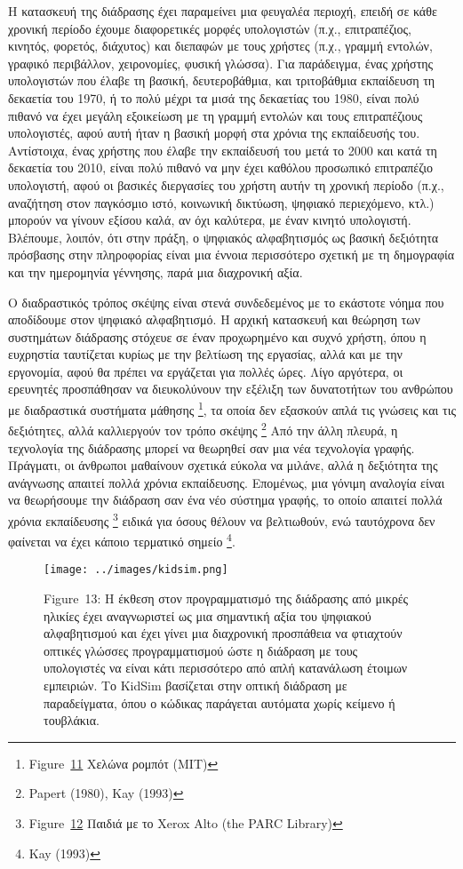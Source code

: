 \documentclass[
]{article}
\begin{document}
Η κατασκευή της διάδρασης έχει παραμείνει μια φευγαλέα περιοχή, επειδή
σε κάθε χρονική περίοδο έχουμε διαφορετικές μορφές υπολογιστών (π.χ.,
επιτραπέζιος, κινητός, φορετός, διάχυτος) και διεπαφών με τους χρήστες
(π.χ., γραμμή εντολών, γραφικό περιβάλλον, χειρονομίες, φυσική γλώσσα).
Για παράδειγμα, ένας χρήστης υπολογιστών που έλαβε τη βασική,
δευτεροβάθμια, και τριτοβάθμια εκπαίδευση τη δεκαετία του 1970, ή το
πολύ μέχρι τα μισά της δεκαετίας του 1980, είναι πολύ πιθανό να έχει
μεγάλη εξοικείωση με τη γραμμή εντολών και τους επιτραπέζιους
υπολογιστές, αφού αυτή ήταν η βασική μορφή στα χρόνια της εκπαίδευσής
του. Αντίστοιχα, ένας χρήστης που έλαβε την εκπαίδευσή του μετά το 2000
και κατά τη δεκαετία του 2010, είναι πολύ πιθανό να μην έχει καθόλου
προσωπικό επιτραπέζιο υπολογιστή, αφού οι βασικές διεργασίες του χρήστη
αυτήν τη χρονική περίοδο (π.χ., αναζήτηση στον παγκόσμιο ιστό, κοινωνική
δικτύωση, ψηφιακό περιεχόμενο, κτλ.) μπορούν να γίνουν εξίσου καλά, αν
όχι καλύτερα, με έναν κινητό υπολογιστή. Βλέπουμε, λοιπόν, ότι στην
πράξη, ο ψηφιακός αλφαβητισμός ως βασική δεξιότητα πρόσβασης στην
πληροφορίας είναι μια έννοια περισσότερο σχετική με τη δημογραφία και
την ημερομηνία γέννησης, παρά μια διαχρονική αξία.

Ο διαδραστικός τρόπος σκέψης είναι στενά συνδεδεμένος με το εκάστοτε
νόημα που αποδίδουμε στον ψηφιακό αλφαβητισμό. Η αρχική κατασκευή και
θεώρηση των συστημάτων διάδρασης στόχευε σε έναν προχωρημένο και συχνό
χρήστη, όπου η ευχρηστία ταυτίζεται κυρίως με την βελτίωση της εργασίας,
αλλά και με την εργονομία, αφού θα πρέπει να εργάζεται για πολλές ώρες.
Λίγο αργότερα, οι ερευνητές προσπάθησαν να διευκολύνουν την εξέλιξη των
δυνατοτήτων του ανθρώπου με διαδραστικά συστήματα μάθησης \footnote{Figure~\protect\hyperlink{fig:logo-robot}{11}
  Χελώνα ρομπότ (MIT)}, τα οποία δεν εξασκούν απλά τις γνώσεις και τις
δεξιότητες, αλλά καλλιεργούν τον τρόπο σκέψης \footnote{Papert (1980),
  Kay (1993)} Από την άλλη πλευρά, η τεχνολογία της διάδρασης μπορεί να
θεωρηθεί σαν μια νέα τεχνολογία γραφής. Πράγματι, οι άνθρωποι μαθαίνουν
σχετικά εύκολα να μιλάνε, αλλά η δεξιότητα της ανάγνωσης απαιτεί πολλά
χρόνια εκπαίδευσης. Επομένως, μια γόνιμη αναλογία είναι να θεωρήσουμε
την διάδραση σαν ένα νέο σύστημα γραφής, το οποίο απαιτεί πολλά χρόνια
εκπαίδευσης \footnote{Figure~\protect\hyperlink{fig:children-alto}{12}
  Παιδιά με το Xerox Alto (the PARC Library)} ειδικά για όσους θέλουν να
βελτιωθούν, ενώ ταυτόχρονα δεν φαίνεται να έχει κάποιο τερματικό σημείο
\footnote{Kay (1993)}.

\leavevmode{}%
\begin{figure}
\hypertarget{fig:kidsim}{%
\centering
\texttt{[image: ../images/kidsim.png]}
\caption{Figure~13: Η έκθεση στον προγραμματισμό της διάδρασης από
μικρές ηλικίες έχει αναγνωριστεί ως μια σημαντική αξία του ψηφιακού
αλφαβητισμού και έχει γίνει μια διαχρονική προσπάθεια να φτιαχτούν
οπτικές γλώσσες προγραμματισμού ώστε η διάδραση με τους υπολογιστές να
είναι κάτι περισσότερο από απλή κατανάλωση έτοιμων εμπειριών. Το KidSim
βασίζεται στην οπτική διάδραση με παραδείγματα, όπου ο κώδικας παράγεται
αυτόματα χωρίς κείμενο ή τουβλάκια.}\label{fig:kidsim}
}
\end{figure}
\end{document}
